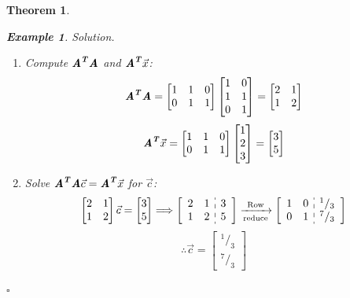 \documentclass[12pt, a4paper]{article}
\newtheorem{thm}{Theorem}[subsection]
\newtheorem{eg}{Example}[subsection]
\newenvironment*{sol}{\indent\textit{Solution. }}{\hfill{$\square$}\par}
\def\T{{\textbf{\emph{T}}}}
\def\vecx{\vec{x}}
\def\matrixA{\textbf{\emph{A}}}
\begin{document}
\begin{thm}
\begin{eg}
\begin{sol}
\begin{enumerate}
				\item Compute $\matrixA^\T\matrixA$ and $\matrixA^\T\vecx$: \[\matrixA^\T\matrixA=\begin{bmatrix}1&1&0\\0&1&1\end{bmatrix}\begin{bmatrix}1&0\\1&1\\0&1\end{bmatrix}=\begin{bmatrix}2&1\\1&2\end{bmatrix}\]\[\matrixA^\T\vecx=\begin{bmatrix}1&1&0\\0&1&1\end{bmatrix}\begin{bmatrix}1\\2\\3\end{bmatrix}=\begin{bmatrix}3\\5\end{bmatrix}\]
				\item Solve $\matrixA^\T\matrixA\vec{c}=\matrixA^\T\vecx$ for $\vec{c}$: 
				\[\begin{bmatrix}2&1\\1&2\end{bmatrix}\vec{c}=\begin{bmatrix}3\\5\end{bmatrix}\Longrightarrow\left[\begin{array}{c:c}\begin{matrix}2&1\\1&2\end{matrix}&\begin{matrix}3\\5\end{matrix}\end{array}\right]\xrightarrow[\text{reduce}]{\text{Row}}\left[\begin{array}{c:c}\begin{matrix}1&0\\0&1\end{matrix}&\begin{matrix}^1/_3\\^7/_3\end{matrix}\end{array}\right]\]
				\[\therefore\vec{c}=\begin{bmatrix}^1/_3\\^7/_3\end{bmatrix}\]

\end{enumerate}
\end{sol}
\end{eg}
\end{thm}
\end{document}
